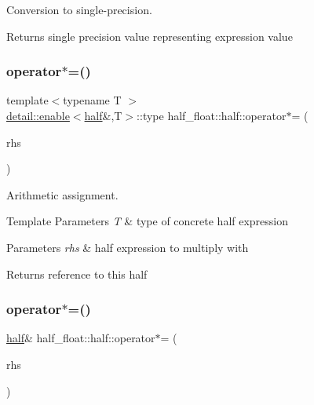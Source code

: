 Conversion to single-\/precision. \begin{DoxyReturn}{Returns}
single precision value representing expression value 
\end{DoxyReturn}
\mbox{\label{classhalf__float_1_1half_a6de077e98651981a899b09738e49d3c3}} 
\subsubsection{\texorpdfstring{operator$\ast$=()}{operator*=()}\hspace{0.1cm}{\footnotesize\ttfamily [1/2]}}
{\footnotesize\ttfamily template$<$typename T $>$ \\
\hyperlink{structhalf__float_1_1detail_1_1enable}{detail\+::enable}$<$\hyperlink{classhalf__float_1_1half}{half}\&,T$>$\+::type half\+\_\+float\+::half\+::operator$\ast$= (\begin{DoxyParamCaption}\item[{T}]{rhs }\end{DoxyParamCaption})\hspace{0.3cm}{\ttfamily [inline]}}

Arithmetic assignment. 
\begin{DoxyTemplParams}{Template Parameters}
{\em T} & type of concrete half expression \\
\hline
\end{DoxyTemplParams}

\begin{DoxyParams}{Parameters}
{\em rhs} & half expression to multiply with \\
\hline
\end{DoxyParams}
\begin{DoxyReturn}{Returns}
reference to this half 
\end{DoxyReturn}
\mbox{\label{classhalf__float_1_1half_ab384d4ffe5c7117d1485f514f1113b50}} 
\subsubsection{\texorpdfstring{operator$\ast$=()}{operator*=()}\hspace{0.1cm}{\footnotesize\ttfamily [2/2]}}
{\footnotesize\ttfamily \hyperlink{classhalf__float_1_1half}{half}\& half\+\_\+float\+::half\+::operator$\ast$= (\begin{DoxyParamCaption}\item[{float}]{rhs }\end{DoxyParamCaption})\hspace{0.3cm}{\ttfamily [inline]}}

